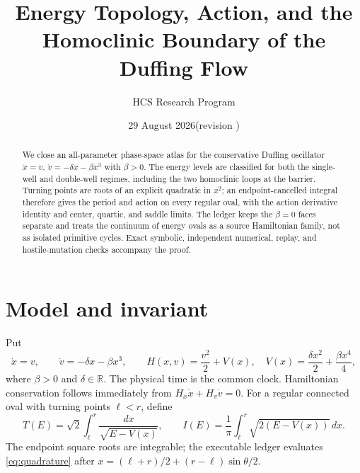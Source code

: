 \documentclass[11pt]{article}
\title{Energy Topology, Action, and the Homoclinic Boundary of the Duffing Flow}
\author{HCS Research Program}
\date{29 August 2026\quad (revision \CRevisionRound)}
\begin{document}
\maketitle

\begin{abstract}
We close an all-parameter phase-space atlas for the conservative Duffing
oscillator $\dot x=v$, $\dot v=-\delta x-\beta x^3$ with $\beta>0$.
The energy levels are classified for both the single-well and double-well
regimes, including the two homoclinic loops at the barrier.  Turning points
are roots of an explicit quadratic in $x^2$; an endpoint-cancelled integral
therefore gives the period and action on every regular oval, with the action
derivative identity and center, quartic, and saddle limits.  The ledger keeps
the $\beta=0$ faces separate and treats the continuum of energy ovals as a
source Hamiltonian family, not as isolated primitive cycles.  Exact symbolic,
independent numerical, replay, and hostile-mutation checks accompany the
proof.
\end{abstract}

\section{Model and invariant}
Put
\begin{equation}
 \dot x=v,\qquad \dot v=-\delta x-\beta x^3,
 \qquad H(x,v)=\frac{v^2}{2}+V(x),\quad
 V(x)=\frac{\delta x^2}{2}+\frac{\beta x^4}{4},
 \label{eq:model}
\end{equation}
where $\beta>0$ and $\delta\in\mathbb R$.  The physical time is the common
clock.  Hamiltonian conservation follows immediately from
$H_x\dot x+H_v\dot v=0$.  For a regular connected oval with turning points
$\ell<r$, define
\begin{equation}
 T(E)=\sqrt{2}\int_\ell^r\frac{dx}{\sqrt{E-V(x)}},\qquad
 I(E)=\frac1\pi\int_\ell^r\sqrt{2(E-V(x))}\,dx .
 \label{eq:quadrature}
\end{equation}
The endpoint square roots are integrable; the executable ledger evaluates
\eqref{eq:quadrature} after $x=(\ell+r)/2+(r-\ell)\sin\theta/2$.
\end{document}

